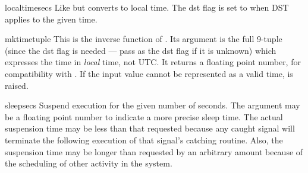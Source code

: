 \begin{funcdesc}{localtime}{secs}
Like  but converts to local time.  The dst flag is
set to  when DST applies to the given time.
\end{funcdesc}

\begin{funcdesc}{mktime}{tuple}
This is the inverse function of .  Its argument
is the full 9-tuple (since the dst flag is needed --- pass 
as the dst flag if it is unknown) which expresses the time in
\emph{local} time, not UTC.  It returns a floating point number, for
compatibility with .  If the input value cannot be
represented as a valid time,  is raised.
\end{funcdesc}

\begin{funcdesc}{sleep}{secs}
Suspend execution for the given number of seconds.  The argument may
be a floating point number to indicate a more precise sleep time.
The actual suspension time may be less than that requested because any
caught signal will terminate the  following
execution of that signal's catching routine.  Also, the suspension
time may be longer than requested by an arbitrary amount because of
the scheduling of other activity in the system.
\end{funcdesc}

